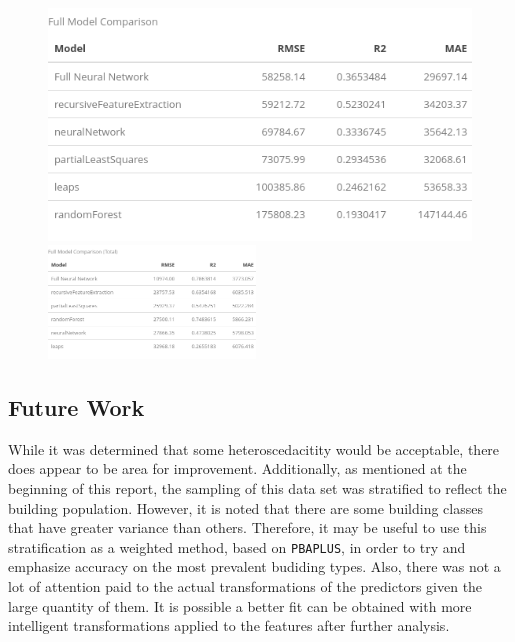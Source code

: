\begin{figure}[h]
\centering
\includegraphics[width=.49\textwidth, height=0.25\textheight]{Images/natural_gas_psf_model_summary.png}
\includegraphics[width=0.49\textwidth, height=0.25\textheight]{Images/natural_gas_psf_model_summary_transformed.png}
\end{figure}

\subsection{Future Work}
While it was determined that some heteroscedacitity would be acceptable, there does appear to be area for improvement.  Additionally, as mentioned at the beginning of this report, the sampling of this data set was stratified to reflect the building population.  However, it is noted that there are some building classes that have greater variance than others.  Therefore, it may be useful to use this stratification as a weighted method, based on \lstinline{PBAPLUS}, in order to try and emphasize accuracy on the most prevalent budiding types. Also, there was not a lot of attention paid to the actual transformations of the predictors given the large quantity of them.  It is possible a better fit can be obtained with more intelligent transformations applied to the features after further analysis.



